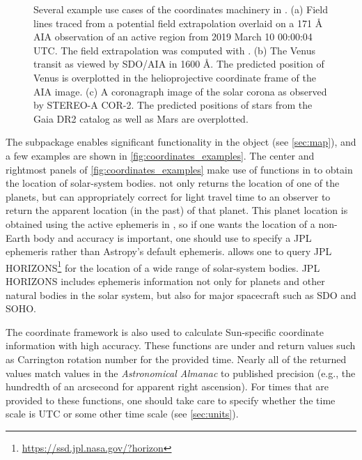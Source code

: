 \begin{figure}
    \caption{Several example use cases of the coordinates machinery in \sunpypkg.
    (a) Field lines traced from a potential field extrapolation overlaid on a 171 \AA{} AIA observation of an active region from 2019 March 10 00:00:04 UTC.
    The field extrapolation was computed with  \citep{david_stansby_2019_3237053}.
    (b) The Venus transit as viewed by SDO/AIA in 1600 \AA. The predicted position of Venus is overplotted in the helioprojective coordinate frame of the AIA image.
    (c) A coronagraph image of the solar corona as observed by STEREO-A COR-2. The predicted positions of stars from the Gaia DR2 catalog as well as Mars are overplotted.}
    \label{fig:coordinates_examples}
\end{figure}

The  subpackage enables significant functionality in the  object (see \autoref{sec:map}), and a few examples are shown in \autoref{fig:coordinates_examples}.
The center and rightmost panels of \autoref{fig:coordinates_examples} make use of functions in  to obtain the location of solar-system bodies.
 not only returns the location of one of the planets, but can appropriately correct for light travel time to an observer to return the apparent location (in the past) of that planet.
This planet location is obtained using the active ephemeris in , so if one wants the location of a non-Earth body and accuracy is important, one should use  to specify a JPL ephemeris rather than Astropy's default ephemeris.
 allows one to query JPL HORIZONS\footnote{\url{https://ssd.jpl.nasa.gov/?horizon}} for the location of a wide range of solar-system bodies.
JPL HORIZONS includes ephemeris information not only for planets and other natural bodies in the solar system, but also for major spacecraft such as SDO and SOHO.

The coordinate framework is also used to calculate Sun-specific coordinate information with high accuracy.
These functions are under  and return values such as Carrington rotation number for the provided time.
Nearly all of the returned values match values in the \textit{Astronomical Almanac} to published precision (e.g., the hundredth of an arcsecond for apparent right ascension).
For times that are provided to these functions, one should take care to specify whether the time scale is UTC or some other time scale (see \autoref{sec:units}).


